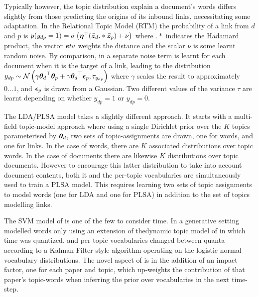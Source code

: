 Typically however, the topic distribution explain a document's words differs slightly from those predicting the origins of its inbound links, necessitating some adaptation. In the Relational Topic Model (RTM)\cite{Chang2009a}\cite{Chang2010a} the probability of a link from $d$ and $p$ is $p(y_{dp} = 1) = \sigma\left(\bm \eta^\top(\bar{\bm z}_d .* \bar{\bm z}_p) + \nu \right)$ where $.*$ indicates the Hadamard product, the vector $\bm eta$ weights the distance and the scalar $\nu$ is some learnt random noise. By comparison, in \cite{Neiswanger2014} a separate noise term is learnt for each document when it is the target of a link, leading to the distribution $y_{dp} \sim \mathcal{N} \left( {\gamma {  \bm \theta _d }^\top\bm \theta_p + \gamma {  \bm \theta _d }^\top\bm \epsilon_p}, {\tau_{y_{dp}}} \right)$ where $\gamma$ scales the result to approximately $0\ldots 1$, and $\bm \epsilon_p$ is drawn from a Gaussian. Two different values of the variance $\tau$ are learnt depending on whether $y_{dp} = 1$ or $y_{dp} = 0$. 

The LDA/PLSA model\cite{Nallapati2008}\cite{Nallapati2008a} takes a slightly different approach. It starts with a multi-field topic-model approach\cite{Blei2003} where using a single Dirichlet prior over the $K$ topics parameterised by ${ \bm \theta_d }$, two sets of topic-assignments are drawn, one for words, and one for links. In the case of words, there are $K$ associated distributions over topic words. In the case of documents there are likewise $K$ distributions over topic documents. However to encourage this latter distribution to take into account document contents, both it and the per-topic vocabularies are simultaneously used to train a PLSA model. This requires learning two sets of topic assignments to model words (one for LDA and one for PLSA) in addition to the set of topics modelling links.

The SVM model of \cite{Bethard2010} is one of the few to consider time. In a generative setting \cite{Gerrish2010} modelled words only using an extension of thedynamic topic model of \cite{Blei2006a} in which time was quantized, and per-topic vocabularies changed between quanta according to a Kalman Filter style algorithm operating on the logistic-normal vocabulary distributions. The novel aspect of \cite{Gerrish2010} is in the addition of an impact factor, one for each paper and topic, which up-weights the contribution of that paper's topic-words when inferring the prior over vocabularies in the next time-step.

